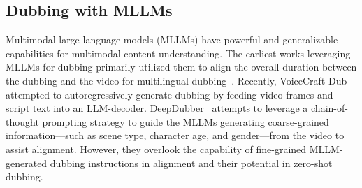 
\subsection{Dubbing with MLLMs} 
Multimodal large language models (MLLMs) have powerful and generalizable capabilities for multimodal content understanding.
The earliest works leveraging MLLMs for dubbing primarily utilized them to align the overall duration between the dubbing and the video for multilingual dubbing~\cite{dubwise}.
Recently, VoiceCraft-Dub~\cite{voicecraftdub} attempted to autoregressively generate dubbing by feeding video frames and script text into an LLM-decoder. DeepDubber~\cite{deepdubber} attempts to leverage a chain-of-thought prompting strategy to guide the MLLMs generating coarse-grained information—such as scene type, character age, and gender—from the video to assist alignment.
However, they overlook the capability of fine-grained MLLM-generated dubbing instructions in alignment and their potential in zero-shot dubbing.